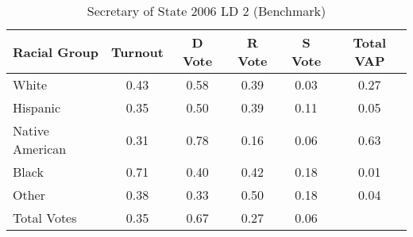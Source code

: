 \begin{table}[htb]
\begin{center}
\caption{Secretary of State 2006 LD 2 (Benchmark)}
\label{sos06_vap_ld_2_benchmark}
\begin{tabular}{lccccc}
  \hline
Racial Group & Turnout & D Vote & R Vote & S Vote & Total VAP \\ 
  \hline
White & 0.43 & 0.58 & 0.39 & 0.03 & 0.27 \\ 
  Hispanic & 0.35 & 0.50 & 0.39 & 0.11 & 0.05 \\ 
  Native American & 0.31 & 0.78 & 0.16 & 0.06 & 0.63 \\ 
  Black & 0.71 & 0.40 & 0.42 & 0.18 & 0.01 \\ 
  Other & 0.38 & 0.33 & 0.50 & 0.18 & 0.04 \\ 
  Total Votes & 0.35 & 0.67 & 0.27 & 0.06 &  \\ 
   \hline
\end{tabular}
\end{center}
\end{table}
